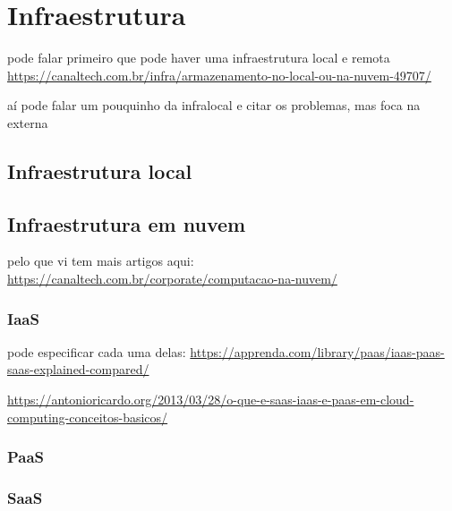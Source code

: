 \chapter{Infraestrutura}

pode falar primeiro que pode haver uma infraestrutura local e remota
\url{https://canaltech.com.br/infra/armazenamento-no-local-ou-na-nuvem-49707/}

aí pode falar um pouquinho da infralocal e citar os problemas,
mas foca na externa

\section{Infraestrutura local}

\section{Infraestrutura em nuvem}

pelo que vi tem mais artigos aqui: \url{https://canaltech.com.br/corporate/computacao-na-nuvem/}

\subsection{IaaS}

pode especificar cada uma delas: 
\url{https://apprenda.com/library/paas/iaas-paas-saas-explained-compared/}

\url{https://antonioricardo.org/2013/03/28/o-que-e-saas-iaas-e-paas-em-cloud-computing-conceitos-basicos/}

\subsection{PaaS}

\subsection{SaaS}
